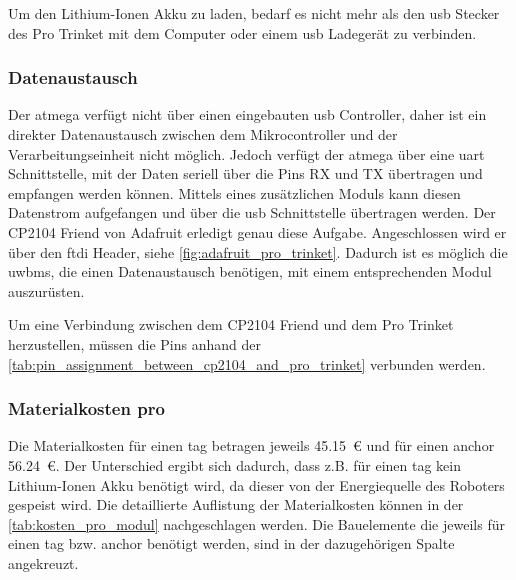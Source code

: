 Um den Lithium-Ionen Akku zu laden, bedarf es nicht mehr als den \Gls{usb} Stecker des Pro Trinket mit dem Computer oder einem \Gls{usb} Ladegerät zu verbinden.


%
%
\subsubsection{Datenaustausch}

Der \Gls{atmega} verfügt nicht über einen eingebauten \Gls{usb} Controller, daher ist ein direkter Datenaustausch zwischen dem Mikrocontroller und der Verarbeitungseinheit nicht möglich. Jedoch verfügt der \Gls{atmega} über eine \gls{uart} Schnittstelle, mit der Daten seriell über die Pins RX und TX übertragen und empfangen werden können. Mittels eines zusätzlichen Moduls kann diesen Datenstrom aufgefangen und über die \Gls{usb} Schnittstelle übertragen werden. Der CP2104 Friend von Adafruit erledigt genau diese Aufgabe. Angeschlossen wird er über den \gls{ftdi} Header, siehe \autoref{fig:adafruit_pro_trinket}. Dadurch ist es möglich die \Glspl{uwbm}, die einen Datenaustausch benötigen, mit einem entsprechenden Modul auszurüsten.

Um eine Verbindung zwischen dem CP2104 Friend und dem Pro Trinket herzustellen, müssen die Pins anhand der \autoref{tab:pin_assignment_between_cp2104_and_pro_trinket} verbunden werden.


%
%
\subsubsection{Materialkosten pro }

Die Materialkosten für einen \gls{tag} betragen jeweils \SI{45.15}{\euro} und für einen \gls{anchor} \SI{56.24}{\euro}. Der Unterschied ergibt sich dadurch, dass z.B. für einen \gls{tag} kein Lithium-Ionen Akku benötigt wird, da dieser von der Energiequelle des Roboters gespeist wird.
Die detaillierte Auflistung der Materialkosten können in der \autoref{tab:kosten_pro_modul} nachgeschlagen werden. Die Bauelemente die jeweils für einen \gls{tag} bzw. \gls{anchor} benötigt werden, sind in der dazugehörigen Spalte angekreuzt.


